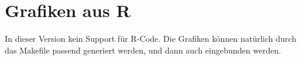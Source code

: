 \documentclass[12pt,a4paper%
              ,oneside     %
              ,titlepage
              ,DIV=13
              ,headinclude
              ,footinclude=false%
              ,cleardoublepage=empty%
              ,parskip=half,
              BCOR=0mm,
              ]{scrreprt}
\begin{document}
\blindtext

\blindtext

\section{Grafiken aus R}

In dieser Version kein Support für R-Code. Die Grafiken können
natürlich durch das Makefile passend generiert werden, und dann
auch eingebunden werden.

\blindtext

\blindtext

\blindtext \blindtext \blindtext





\appendix

\AuthorDeclaration


\listoffigures %
\listoftables %

\renewcommand{\bibfont}{\footnotesize}
\printbibliography[title={Literaturverzeichnis}, 
                   heading=bibintoc]


{ %
\printindex
}
\end{document}
